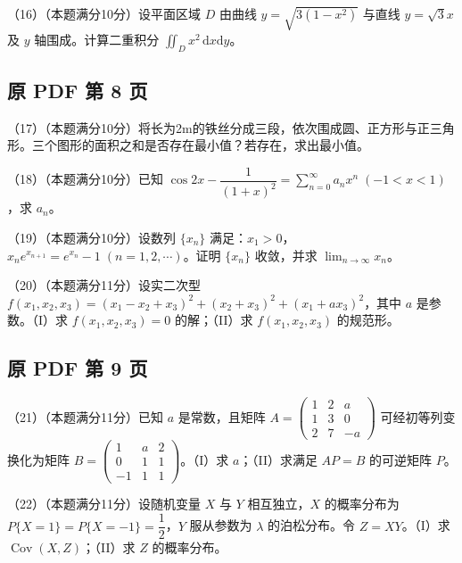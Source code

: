 \documentclass[UTF8,12pt]{ctexart}
\begin{document}
（16）（本题满分10分）设平面区域 \(\displaystyle D\) 由曲线 \(\displaystyle y=\sqrt{3(1-x^2)}\) 与直线 \(\displaystyle y=\sqrt3x\) 及 \(\displaystyle y\) 轴围成。计算二重积分 \(\displaystyle \iint_D x^2\,\mathrm dx\mathrm dy\)。


\clearpage

\subsection*{原 PDF 第 8 页}

（17）（本题满分10分）将长为2m的铁丝分成三段，依次围成圆、正方形与正三角形。三个图形的面积之和是否存在最小值？若存在，求出最小值。


（18）（本题满分10分）已知 \(\displaystyle \cos2x-\dfrac{\displaystyle 1}{\displaystyle (1+x)^2}=\displaystyle \sum_{n=0}^{\infty}a_nx^n\;(-1<x<1)\)，求 \(\displaystyle a_n\)。


（19）（本题满分10分）设数列 \(\displaystyle \{x_n\}\) 满足：\(\displaystyle x_1>0\)，\(\displaystyle x_ne^{x_{n+1}}=e^{x_n}-1\;(n=1,\allowbreak 2,\allowbreak \cdots)\)。证明 \(\displaystyle \{x_n\}\) 收敛，并求 \(\displaystyle \lim_{n\to\infty}x_n\)。


（20）（本题满分11分）设实二次型 \(\displaystyle f(x_1,\allowbreak x_2,\allowbreak x_3)=(x_1-x_2+x_3)^2+(x_2+x_3)^2+(x_1+ax_3)^2\)，其中 \(\displaystyle a\) 是参数。（I）求 \(\displaystyle f(x_1,\allowbreak x_2,\allowbreak x_3)=0\) 的解；（II）求 \(\displaystyle f(x_1,\allowbreak x_2,\allowbreak x_3)\) 的规范形。


\clearpage

\subsection*{原 PDF 第 9 页}

（21）（本题满分11分）已知 \(\displaystyle a\) 是常数，且矩阵 \(\displaystyle A=\begin{pmatrix}1&2&a\\1&3&0\\2&7&-a\end{pmatrix}\) 可经初等列变换化为矩阵 \(\displaystyle B=\begin{pmatrix}1&a&2\\0&1&1\\-1&1&1\end{pmatrix}\)。（I）求 \(\displaystyle a\)；（II）求满足 \(\displaystyle AP=B\) 的可逆矩阵 \(\displaystyle P\)。


（22）（本题满分11分）设随机变量 \(\displaystyle X\) 与 \(\displaystyle Y\) 相互独立，\(\displaystyle X\) 的概率分布为 \(\displaystyle P\{X=1\}=P\{X=-1\}=\dfrac{\displaystyle 1}{\displaystyle 2}\)，\(\displaystyle Y\) 服从参数为 \(\displaystyle \lambda\) 的泊松分布。令 \(\displaystyle Z=XY\)。（I）求 \(\displaystyle \operatorname{Cov}(X,\allowbreak Z)\)；（II）求 \(\displaystyle Z\) 的概率分布。
\end{document}
